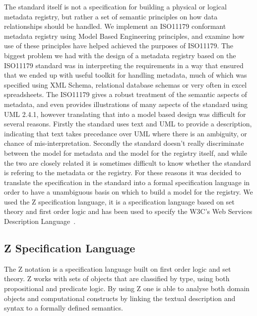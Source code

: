 \documentclass{llncs}
\begin{document}
The standard itself is not a specification for building a physical or logical metadata registry, but rather a set of semantic principles on how data relationships should be handled. We implement an ISO11179 conformant metadata registry using Model Based Engineering principles, and examine how use of these principles have helped achieved the purposes of ISO11179. The biggest problem we had with the design of a metadata registry based on the ISO11179 standard was in interpreting the requirements in a way that ensured that we ended up with useful toolkit for handling metadata, much of which was specified using XML Schema, relational database schemas or very often in excel spreadsheets. The ISO11179 gives a robust treatment of the semantic aspects of metadata, and even provides illustrations of many aspects of the standard using UML 2.4.1, however translating that into a model based design was difficult for several reasons. Firstly the standard uses text and UML to provide a description, indicating that text takes precedance over UML where there is an ambiguity, or chance of mis-interpretation. Secondly the standard doesn't really discriminate between the model for metadata and the model for the registry itself, and while the two are closely related it is sometimes difficult to know whether the standard is refering to the metadata or the registry. For these reasons it was decided to translate the specification in the standard into a formal specification language in order to have a unambiguous basis on which to build a model for the registry. We used the Z specification language, it is a specification language based on set theory and first order logic and has been used to specify the W3C's Web Services Description Language~\cite{WSDL}.

\subsection{Z Specification Language}

The Z notation is a specification language built on first order logic and set theory. Z works with sets of objects that are classified by type, using both propositional and predicate logic. By using Z one is able to analyse both domain objects and computational constructs by linking the textual description and syntax to a formally defined semantics. 
\end{document}
